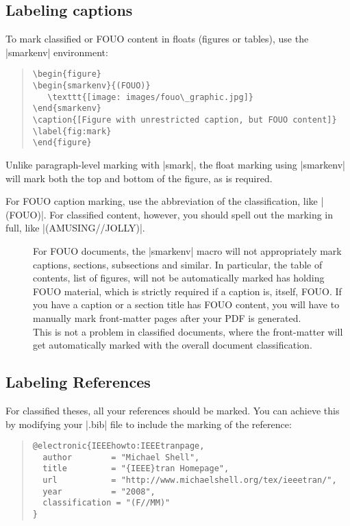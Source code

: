 \subsection{Labeling captions}
To mark classified or FOUO content in floats (figures or tables), use
the |smarkenv| environment:

\begin{quotation}
\begin{Verbatim}[fontsize=\small]
\begin{figure}
\begin{smarkenv}{(FOUO)}
   \texttt{[image: images/fouo\_graphic.jpg]}
\end{smarkenv}
\caption{[Figure with unrestricted caption, but FOUO content]}
\label{fig:mark}
\end{figure}
\end{Verbatim}
\end{quotation}
Unlike paragraph-level marking with |smark|, the float marking using |smarkenv| 
will mark both the top and bottom of the figure, as is required.

For FOUO caption marking, use the abbreviation of the classification, like |(FOUO)|.
For classified content, however, you should spell out the marking in full, like |(AMUSING//JOLLY)|.

\begin{description}
\item[]
For FOUO documents, the |smarkenv| macro will not appropriately mark
captions, sections, subsections and similar.
In particular, the table of contents, list of figures, \etc will not be automatically
marked has holding FOUO material, which is strictly required if a caption is, itself, FOUO. 
If you have a caption or a section title has FOUO content, you will have to manually
mark front-matter pages after your PDF is generated.\\
This is not a problem in classified documents, where the front-matter 
will get automatically marked with the overall document classification.
\end{description}

\subsection{Labeling References}
For classified theses, all your references should be marked. You can achieve this
by modifying your |.bib| file to include the marking of the reference:

\begin{quotation}
\begin{Verbatim}
@electronic{IEEEhowto:IEEEtranpage,
  author        = "Michael Shell",
  title         = "{IEEE}tran Homepage",
  url           = "http://www.michaelshell.org/tex/ieeetran/",
  year          = "2008",
  classification = "(F//MM)"
}
\end{Verbatim}
\end{quotation}

